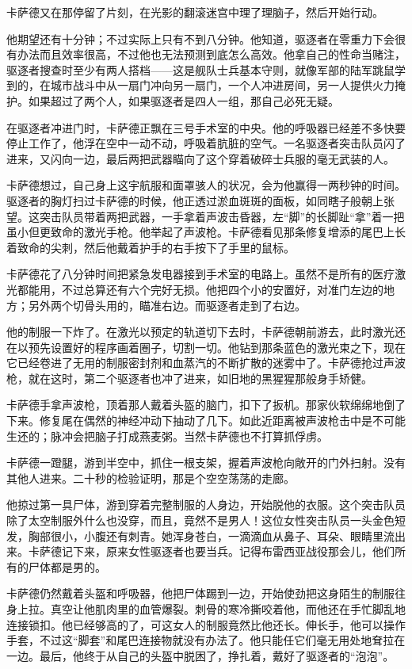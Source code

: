 \documentclass[AutoFakeBold=true]{book}
\begin{document}
卡萨德又在那停留了片刻，在光影的翻滚迷宫中理了理脑子，然后开始行动。

他期望还有十分钟；不过实际上只有不到八分钟。他知道，驱逐者在零重力下会很有办法而且效率很高，不过他也无法预测到底怎么高效。他拿自己的性命当赌注，驱逐者搜查时至少有两人搭档——这是舰队士兵基本守则，就像军部的陆军跳鼠学到的，在城市战斗中从一扇门冲向另一扇门，一个人冲进房间，另一人提供火力掩护。如果超过了两个人，如果驱逐者是四人一组，那自己必死无疑。

在驱逐者冲进门时，卡萨德正飘在三号手术室的中央。他的呼吸器已经差不多快要停止工作了，他浮在空中一动不动，呼吸着肮脏的空气。一名驱逐者突击队员闪了进来，又闪向一边，最后两把武器瞄向了这个穿着破碎士兵服的毫无武装的人。

卡萨德想过，自己身上这宇航服和面罩骇人的状况，会为他赢得一两秒钟的时间。驱逐者的胸灯扫过卡萨德的时候，他正透过淤血斑斑的面板，如同瞎子般朝上张望。这突击队员带着两把武器，一手拿着声波击昏器，左``脚''的长脚趾``拿''着一把虽小但更致命的激光手枪。他举起了声波枪。卡萨德看见那条修复增添的尾巴上长着致命的尖刺，然后他戴着护手的右手按下了手里的鼠标。

卡萨德花了八分钟时间把紧急发电器接到手术室的电路上。虽然不是所有的医疗激光都能用，不过总算还有六个完好无损。他把四个小的安置好，对准门左边的地方；另外两个切骨头用的，瞄准右边。而驱逐者走到了右边。

他的制服一下炸了。在激光以预定的轨道切下去时，卡萨德朝前游去，此时激光还在以预先设置好的程序画着圈子，切割一切。他钻到那条蓝色的激光束之下，现在它已经卷进了无用的制服密封剂和血蒸汽的不断扩散的迷雾中了。卡萨德抢过声波枪，就在这时，第二个驱逐者也冲了进来，如旧地的黑猩猩那般身手矫健。

卡萨德手拿声波枪，顶着那人戴着头盔的脑门，扣下了扳机。那家伙软绵绵地倒了下来。修复尾在偶然的神经冲动下抽动了几下。如此近距离被声波枪击中是不可能生还的；脉冲会把脑子打成燕麦粥。当然卡萨德也不打算抓俘虏。

卡萨德一蹬腿，游到半空中，抓住一根支架，握着声波枪向敞开的门外扫射。没有其他人进来。二十秒的检验证明，那是个空空荡荡的走廊。

他掠过第一具尸体，游到穿着完整制服的人身边，开始脱他的衣服。这个突击队员除了太空制服外什么也没穿，而且，竟然不是男人！这位女性突击队员一头金色短发，胸部很小，小腹还有刺青。她浑身苍白，一滴滴血从鼻子、耳朵、眼睛里流出来。卡萨德记下来，原来女性驱逐者也要当兵。记得布雷西亚战役那会儿，他们所有的尸体都是男的。

卡萨德仍然戴着头盔和呼吸器，他把尸体踢到一边，开始使劲把这身陌生的制服往身上拉。真空让他肌肉里的血管爆裂。刺骨的寒冷撕咬着他，而他还在手忙脚乱地连接锁扣。他已经够高的了，可这女人的制服竟然比他还长。伸长手，他可以操作手套，不过这``脚套''和尾巴连接物就没有办法了。他只能任它们毫无用处地耷拉在一边。最后，他终于从自己的头盔中脱困了，挣扎着，戴好了驱逐者的``泡泡''。
\end{document}
